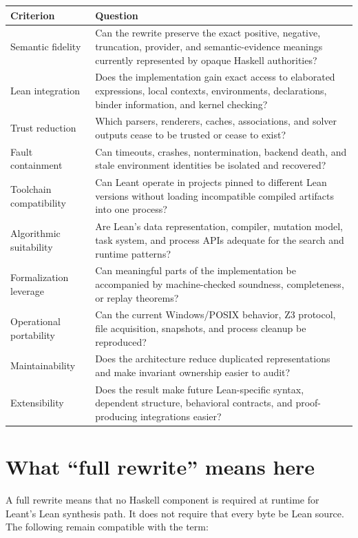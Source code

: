 \documentclass[10pt,letterpaper,oneside]{report}
\begin{document}
\begin{longtable}{@{}L{0.23\textwidth}L{0.69\textwidth}@{}}
\toprule
\textbf{Criterion} & \textbf{Question} \\
\midrule
\endhead
Semantic fidelity & Can the rewrite preserve the exact positive, negative, truncation, provider, and semantic-evidence meanings currently represented by opaque Haskell authorities? \\
Lean integration & Does the implementation gain exact access to elaborated expressions, local contexts, environments, declarations, binder information, and kernel checking? \\
Trust reduction & Which parsers, renderers, caches, associations, and solver outputs cease to be trusted or cease to exist? \\
Fault containment & Can timeouts, crashes, nontermination, backend death, and stale environment identities be isolated and recovered? \\
Toolchain compatibility & Can Leant operate in projects pinned to different Lean versions without loading incompatible compiled artifacts into one process? \\
Algorithmic suitability & Are Lean's data representation, compiler, mutation model, task system, and process APIs adequate for the search and runtime patterns? \\
Formalization leverage & Can meaningful parts of the implementation be accompanied by machine-checked soundness, completeness, or replay theorems? \\
Operational portability & Can the current Windows/POSIX behavior, Z3 protocol, file acquisition, snapshots, and process cleanup be reproduced? \\
Maintainability & Does the architecture reduce duplicated representations and make invariant ownership easier to audit? \\
Extensibility & Does the result make future Lean-specific syntax, dependent structure, behavioral contracts, and proof-producing integrations easier? \\
\bottomrule
\end{longtable}

\section{What ``full rewrite'' means here}

A full rewrite means that no Haskell component is required at runtime for Leant's Lean synthesis path. It does not require that every byte be Lean source. The following remain compatible with the term:
\end{document}
